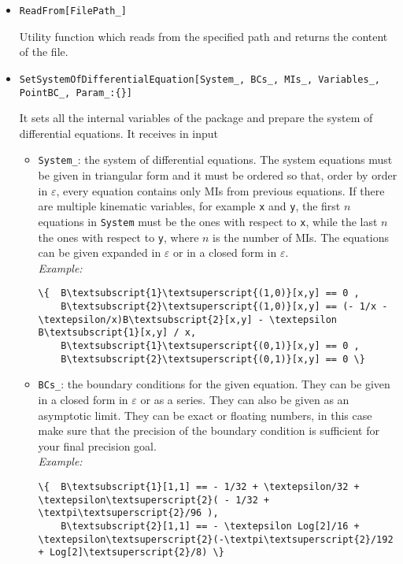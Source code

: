 \begin{itemize}
    \item \texttt{ReadFrom[FilePath\_]} 
    
    Utility function which reads from the specified path and returns the content of the file.
    
    \item \texttt{SetSystemOfDifferentialEquation[System\_, BCs\_, MIs\_, Variables\_, PointBC\_, Param\_:\{\}]}
    
    It sets all the internal variables of the package and prepare the system of differential equations. It receives in input
    \begin{itemize}
        \item \texttt{System\_}: the system of differential equations. The system equations must be given in triangular form and it must be ordered so that, order by order in $\varepsilon$, every equation contains only MIs from previous equations. If there are multiple kinematic variables, for example \texttt{x} and \texttt{y}, the first $n$ equations in \texttt{System} must be the ones with respect to \texttt{x}, while the last $n$ the ones with respect to \texttt{y}, where $n$ is the number of MIs. The equations can be given expanded in $\varepsilon$ or in a closed form in $\varepsilon$.\\
        \textit{Example:}
\begin{Verbatim}[commandchars=\\\{\}]
\{  B\textsubscript{1}\textsuperscript{(1,0)}[x,y] == 0 ,
    B\textsubscript{2}\textsuperscript{(1,0)}[x,y] == (- 1/x - \textepsilon/x)B\textsubscript{2}[x,y] - \textepsilon B\textsubscript{1}[x,y] / x,
    B\textsubscript{1}\textsuperscript{(0,1)}[x,y] == 0 ,
    B\textsubscript{2}\textsuperscript{(0,1)}[x,y] == 0 \}
\end{Verbatim}
        \item \texttt{BCs\_}: the boundary conditions for the given equation. They can be given in a closed form in $\varepsilon$ or as a series. They can also be given as an asymptotic limit. They can be exact or floating numbers, in this case make sure that the precision of the boundary condition is sufficient for your final precision goal.
        \\
        \textit{Example:}
\begin{Verbatim}[commandchars=\\\{\}]
\{  B\textsubscript{1}[1,1] == - 1/32 + \textepsilon/32 + \textepsilon\textsuperscript{2}( - 1/32 + \textpi\textsuperscript{2}/96 ),
    B\textsubscript{2}[1,1] == - \textepsilon Log[2]/16 + \textepsilon\textsuperscript{2}(-\textpi\textsuperscript{2}/192 + Log[2]\textsuperscript{2}/8) \}
\end{Verbatim}
        

\end{itemize}
\end{itemize}
